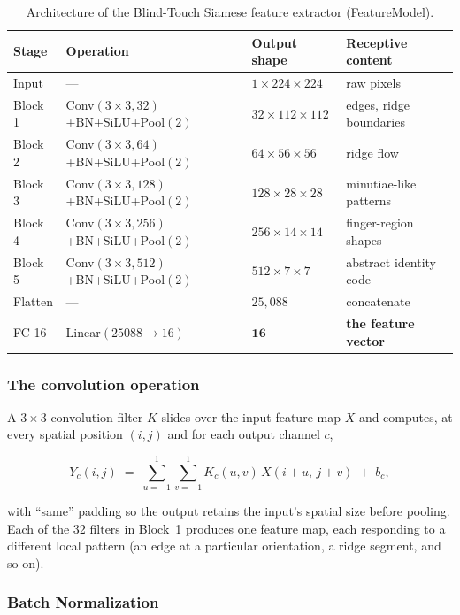 \documentclass[11pt]{article}
\begin{document}
\begin{table}[h]
\centering
\begin{tabular}{llll}
\toprule
Stage & Operation & Output shape & Receptive content \\
\midrule
Input    & ---                                & $1\times224\times224$   & raw pixels \\
Block 1  & Conv$(3{\times}3,32)$+BN+SiLU+Pool$(2)$ & $32\times112\times112$  & edges, ridge boundaries \\
Block 2  & Conv$(3{\times}3,64)$+BN+SiLU+Pool$(2)$ & $64\times56\times56$  & ridge flow \\
Block 3  & Conv$(3{\times}3,128)$+BN+SiLU+Pool$(2)$& $128\times28\times28$ & minutiae-like patterns \\
Block 4  & Conv$(3{\times}3,256)$+BN+SiLU+Pool$(2)$& $256\times14\times14$   & finger-region shapes \\
Block 5  & Conv$(3{\times}3,512)$+BN+SiLU+Pool$(2)$& $512\times7\times7$   & abstract identity code \\
Flatten  & ---                                & $25{,}088$              & concatenate \\
FC-16    & Linear$(25088\rightarrow16)$        & $\mathbf{16}$          & \textbf{the feature vector} \\
\bottomrule
\end{tabular}
\caption{Architecture of the Blind-Touch Siamese feature extractor (FeatureModel).}
\label{tab:arch}
\end{table}

\subsubsection{The convolution operation}

A $3\times 3$ convolution filter $K$ slides over the input feature map $X$ and computes,
at every spatial position $(i,j)$ and for each output channel $c$,

\begin{equation}
Y_{c}(i,j) \;=\; \sum_{u=-1}^{1}\sum_{v=-1}^{1} K_{c}(u,v)\,X(i+u,\,j+v) \;+\; b_c ,
\end{equation}

with ``same'' padding so the output retains the input's spatial size before pooling. Each
of the 32 filters in Block~1 produces one feature map, each responding to a different local
pattern (an edge at a particular orientation, a ridge segment, and so on).

\subsubsection{Batch Normalization}
\end{document}

